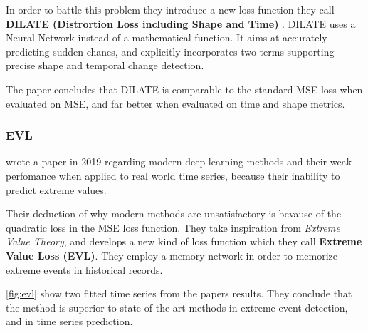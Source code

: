 In order to battle this problem they introduce a new loss function they call 
\textbf{DILATE (Distrortion Loss including Shape and Time)} \cite{Guen2019}.
DILATE uses a Neural Network instead of a mathematical function. 
It aims at accurately predicting sudden chanes, and explicitly incorporates two terms
supporting precise shape and temporal change detection.

The paper concludes that DILATE is comparable to the standard MSE loss when evaluated on MSE,
and far better when evaluated on time and shape metrics.


\subsubsection{EVL}
\citeauthor{Ding2019} wrote a paper in 2019 regarding modern deep learning methods and their
weak perfomance when applied to real world time series, because their inability to predict extreme values.

Their deduction of why modern methods are unsatisfactory is bevause of the quadratic loss in 
the MSE loss function.
They take inspiration from \textit{Extreme Value Theory}, and develops a new kind of loss function
which they call \textbf{Extreme Value Loss (EVL)}.
They employ a memory network in order to memorize extreme events in historical records.

\autoref{fig:evl} show two fitted time series from the papers results. They conclude
that the method is superior to state of the art methods in extreme event detection, and 
in time series prediction.

